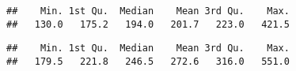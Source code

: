 \documentclass[
]{article}
\newenvironment{Shaded}{\begin{snugshade}}{\end{snugshade}}
\newcommand{\FunctionTok}[1]{\textcolor[rgb]{0.00,0.00,0.00}{#1}}
\newcommand{\NormalTok}[1]{#1}
\newcommand{\SpecialCharTok}[1]{\textcolor[rgb]{0.00,0.00,0.00}{#1}}
\begin{document}
\begin{Shaded}
\end{Shaded}

\begin{verbatim}
##    Min. 1st Qu.  Median    Mean 3rd Qu.    Max. 
##   130.0   175.2   194.0   201.7   223.0   421.5
\end{verbatim}

\begin{Shaded}
\end{Shaded}

\begin{verbatim}
##    Min. 1st Qu.  Median    Mean 3rd Qu.    Max. 
##   179.5   221.8   246.5   272.6   316.0   551.0
\end{verbatim}
\end{document}
